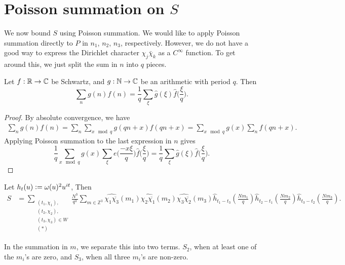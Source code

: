 \section{Poisson summation on $S$}
We now bound $S$ using Poisson summation. We would like to apply Poisson summation directly to $P$ in $n_1$, $n_2$, $n_3$, respectively. However, we do not have a good way to express the Dirichlet character $\chi_j\bar\chi_k$ as a $C^\infty$ function. To get around this, we just split the sum in $n$ into $q$ pieces. 
\begin{lemma}
    Let $f:\mathbb{R} \to \mathbb{C}$ be Schwartz, and $g:\mathbb{N}\to\mathbb{C}$ be an arithmetic with period $q$. Then \[
    \sum_n g(n)f(n) = \frac{1}{q}\sum_{\xi} \hat{g}(\xi)\hat{f}\bigg(\frac{\xi}{q}\bigg). 
    \]
\end{lemma}
\begin{proof}
    By absolute convergence, we have \begin{align*}
        \sum_n g(n)f(n) = \sum_n \sum_{x\mod q} g(qn+x)f(qn+x)=  \sum_{x\mod q} g(x)\sum_n f(qn+x).
    \end{align*}
    Applying Poisson summation to the last expression in $n$ gives \[
        \frac{1}{q} \sum_{x\mod q} g(x) \sum_{\xi} e\bigg(\frac{-x\xi}{q}\bigg)\hat{f}\bigg(\frac{\xi}{q}\bigg)= \frac{1}{q}\sum_{\xi} \hat{g}(\xi)\hat{f}\bigg(\frac{\xi}{q}\bigg).
    \]
\end{proof}
\begin{corollary}
    Let $h_t(u)\mathrel{\mathop:}=\omega(u)^2u^{it}$,
    Then \begin{align*}
        S&=\sum_{\substack{(t_1,\chi_1),\\(t_2,\chi_2),\\(t_3,\chi_3)\in W \\ (*)}}
        \frac{N^3}{q^3}\sum_{m\in\mathbb{Z}^3}\widehat{{\chi_1{\overline{\chi_3}}}}(m_1)\widehat{\chi_2\overline{\chi_1}}(m_2)\widehat{\chi_3\overline{\chi_2}}(m_3)
         \hat{h}_{t_1-t_3}\left(\frac{Nm_1}{q}\right)\hat{h}_{t_2-t_1}\left(\frac{Nm_2}{q}\right)\hat{h}_{t_3-t_2}\left(\frac{Nm_3}{q}\right).
    \end{align*}
\end{corollary}

In the summation in $m$, we separate this into two terms. $S_2$, when at least one of the $m_i$'s are zero, and $S_3$, when all three $m_i$'s are non-zero.

